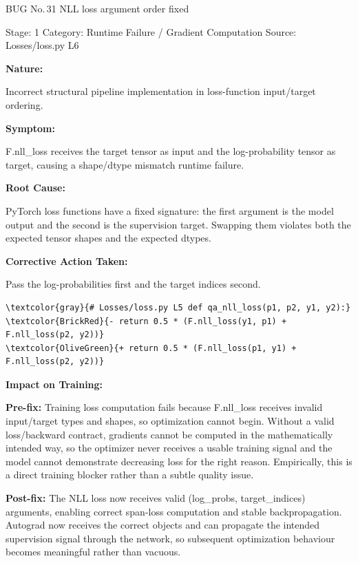 \documentclass[10pt]{article}
\newcommand{\FieldLabel}[1]{%
 {\bfseries #1:}\par
}
\begin{document}
\begin{bugbox}{BUG No.\,31 \quad NLL loss argument order fixed}
{\color{MetaGray}\small Stage: 1 \;\textbar\; Category: Runtime Failure / Gradient Computation \;\textbar\; Source: Losses/loss.py L6\par}
\vspace{0.22em}
\FieldLabel{Nature}
Incorrect structural pipeline implementation in loss-function input/target ordering.
\par
\vspace{0.35em}
\FieldLabel{Symptom}
F.nll\_loss receives the target tensor as input and the log-probability tensor as target, causing a shape/dtype mismatch runtime failure.
\par
\vspace{0.35em}
\FieldLabel{Root Cause}
PyTorch loss functions have a fixed signature: the first argument is the model output and the second is the supervision target. Swapping them violates both the expected tensor shapes and the expected dtypes.
\par
\vspace{0.35em}
\FieldLabel{Corrective Action Taken}
Pass the log-probabilities first and the target indices second.
\par
\vspace{0.35em}
\begin{Verbatim}[commandchars=\\\{\},fontsize=\footnotesize,breaklines=true,breaksymbol={},frame=leftline,framerule=2pt,rulecolor=\color{gray!40},xleftmargin=6pt,formatcom=\singlespacing]
\textcolor{gray}{# Losses/loss.py L5 def qa_nll_loss(p1, p2, y1, y2):}
\textcolor{BrickRed}{- return 0.5 * (F.nll_loss(y1, p1) + F.nll_loss(p2, y2))}
\textcolor{OliveGreen}{+ return 0.5 * (F.nll_loss(p1, y1) + F.nll_loss(p2, y2))}
\end{Verbatim}
\vspace{0.22em}
\FieldLabel{Impact on Training}
\textbf{Pre-fix:} Training loss computation fails because F.nll\_loss receives invalid input/target types and shapes, so optimization cannot begin. Without a valid loss/backward contract, gradients cannot be computed in the mathematically intended way, so the optimizer never receives a usable training signal and the model cannot demonstrate decreasing loss for the right reason. Empirically, this is a direct training blocker rather than a subtle quality issue.\par\smallskip
\textbf{Post-fix:} The NLL loss now receives valid (log\_probs, target\_indices) arguments, enabling correct span-loss computation and stable backpropagation. Autograd now receives the correct objects and can propagate the intended supervision signal through the network, so subsequent optimization behaviour becomes meaningful rather than vacuous.
\par
\vspace{0.35em}
\end{bugbox}
\end{document}
